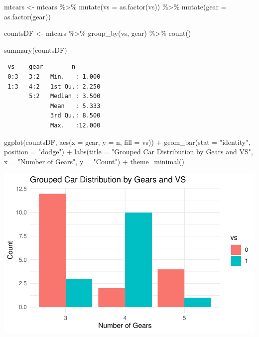 \documentclass[
  letterpaper,
  DIV=11,
  numbers=noendperiod]{scrreprt}
\newenvironment{Shaded}{\begin{snugshade}}{\end{snugshade}}
\newcommand{\AttributeTok}[1]{\textcolor[rgb]{0.40,0.45,0.13}{#1}}
\newcommand{\FunctionTok}[1]{\textcolor[rgb]{0.28,0.35,0.67}{#1}}
\newcommand{\NormalTok}[1]{\textcolor[rgb]{0.00,0.23,0.31}{#1}}
\newcommand{\OtherTok}[1]{\textcolor[rgb]{0.00,0.23,0.31}{#1}}
\newcommand{\SpecialCharTok}[1]{\textcolor[rgb]{0.37,0.37,0.37}{#1}}
\newcommand{\StringTok}[1]{\textcolor[rgb]{0.13,0.47,0.30}{#1}}
\begin{document}
\begin{Shaded}
\begin{Highlighting}[]
\NormalTok{mtcars }\OtherTok{\textless{}{-}}\NormalTok{ mtcars }\SpecialCharTok{\%\textgreater{}\%}
    \FunctionTok{mutate}\NormalTok{(}\AttributeTok{vs =} \FunctionTok{as.factor}\NormalTok{(vs)) }\SpecialCharTok{\%\textgreater{}\%}
    \FunctionTok{mutate}\NormalTok{(}\AttributeTok{gear =} \FunctionTok{as.factor}\NormalTok{(gear))}


\NormalTok{countsDF }\OtherTok{\textless{}{-}}\NormalTok{ mtcars }\SpecialCharTok{\%\textgreater{}\%}
    \FunctionTok{group\_by}\NormalTok{(vs, gear) }\SpecialCharTok{\%\textgreater{}\%}
    \FunctionTok{count}\NormalTok{()}

\FunctionTok{summary}\NormalTok{(countsDF)}
\end{Highlighting}
\end{Shaded}

\begin{verbatim}
 vs    gear        n         
 0:3   3:2   Min.   : 1.000  
 1:3   4:2   1st Qu.: 2.250  
       5:2   Median : 3.500  
             Mean   : 5.333  
             3rd Qu.: 8.500  
             Max.   :12.000  
\end{verbatim}

\begin{Shaded}
\begin{Highlighting}[]
\FunctionTok{ggplot}\NormalTok{(countsDF, }\FunctionTok{aes}\NormalTok{(}\AttributeTok{x =}\NormalTok{ gear, }\AttributeTok{y =}\NormalTok{ n, }\AttributeTok{fill =}\NormalTok{ vs)) }\SpecialCharTok{+} \FunctionTok{geom\_bar}\NormalTok{(}\AttributeTok{stat =} \StringTok{"identity"}\NormalTok{,}
    \AttributeTok{position =} \StringTok{"dodge"}\NormalTok{) }\SpecialCharTok{+} \FunctionTok{labs}\NormalTok{(}\AttributeTok{title =} \StringTok{"Grouped Car Distribution by Gears and VS"}\NormalTok{,}
    \AttributeTok{x =} \StringTok{"Number of Gears"}\NormalTok{, }\AttributeTok{y =} \StringTok{"Count"}\NormalTok{) }\SpecialCharTok{+} \FunctionTok{theme\_minimal}\NormalTok{()}
\end{Highlighting}
\end{Shaded}

\includegraphics{dataviz_files/figure-pdf/unnamed-chunk-36-1.pdf}
\end{document}

